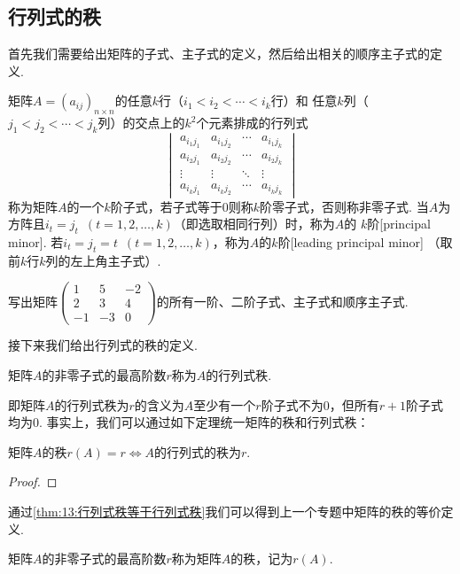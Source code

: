 \subsection{行列式的秩}
首先我们需要给出矩阵的子式、主子式的定义，然后给出相关的顺序主子式的定义.
\begin{definition}
    矩阵$A=(a_{ij})_{n \times n}$的任意$k$行（$i_1<i_2<\cdots<i_k$行）和
    任意$k$列（$j_1<j_2<\cdots<j_k$列）的交点上的$k^2$个元素排成的行列式
    \[\begin{vmatrix}
        a_{i_1j_1} & a_{i_1j_2} & \cdots & a_{i_1j_k} \\
        a_{i_2j_1} & a_{i_2j_2} & \cdots & a_{i_2j_k} \\
        \vdots & \vdots & \ddots  & \vdots \\
        a_{i_kj_1} & a_{i_kj_2} & \cdots & a_{i_kj_k}
    \end{vmatrix}\]
    称为矩阵$A$的一个$k$阶子式，若子式等于0则称$k$阶零子式，否则称非零子式.
    当$A$为方阵且$i_t=j_t\enspace(t=1,2,\ldots,k)$（即选取相同行列）时，称为$A$的
    $k$阶[principal minor]. 若$i_t=j_t=t\enspace(t=1,2,\ldots,k)$，称为$A$的$k$阶[leading principal minor]
    （取前$k$行$k$列的左上角主子式）.
\end{definition}
\begin{example}
    写出矩阵$\begin{pmatrix}
        1 & 5 & -2 \\ 2 & 3 & 4 \\ -1 & -3 & 0
    \end{pmatrix}$的所有一阶、二阶子式、主子式和顺序主子式.
\end{example}
接下来我们给出行列式的秩的定义.
\begin{definition}
    矩阵$A$的非零子式的最高阶数$r$称为$A$的行列式秩.
\end{definition}
\raggedright 即矩阵$A$的行列式秩为$r$的含义为$A$至少有一个$r$阶子式不为0，但所有$r+1$阶子式均为0.
事实上，我们可以通过如下定理统一矩阵的秩和行列式秩：
\begin{theorem}\label{thm:13:行列式秩等于行列式秩}
    矩阵$A$的秩$r(A)=r \iff A$的行列式的秩为$r$.
\end{theorem}
\begin{proof}
    
\end{proof}

\raggedright 通过\autoref{thm:13:行列式秩等于行列式秩}我们可以得到上一个专题中矩阵的秩的等价定义.
\begin{definition}
    矩阵$A$的非零子式的最高阶数$r$称为矩阵$A$的秩，记为$r(A)$.
\end{definition}

